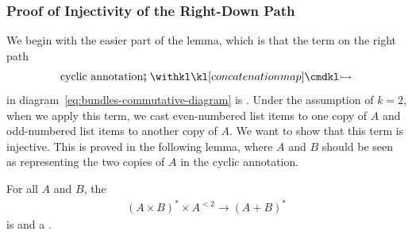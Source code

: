\subsubsection{Proof of Injectivity of the Right-Down Path}
\label{sec:bundle-injectivity}
We begin with the easier part of the lemma, which is that the term on the right  path
\begin{align*}
    \text{cyclic annotation}\comp \concmap
\end{align*}
in diagram~\eqref{eq:bundles-commutative-diagram}
is . Under the assumption of $k=2$, when we apply this term, we cast even-numbered list items to one copy of $A$ and odd-numbered list items to another copy of $A$. We want to show that this term is injective. This is proved in the following lemma, where $A$ and $B$ should be seen as representing the two copies of $A$ in the cyclic annotation.
\begin{lemma}\label{lem:injectivity-of-cyclic-annotation}
    For all  $A$ and $B$, the 
    \begin{align*}
        (A \times B)^* \times A^{<2} \to (A + B)^*
    \end{align*}
    is  and a .
\end{lemma}
